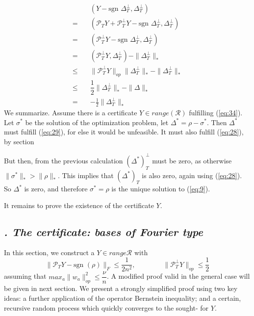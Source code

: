\documentclass{article}
\begin{document}
\begin{align*}
&(Y-\text{sgn }\Delta_T^\perp, \Delta_T^\perp)\\
=\quad&(\mathcal{P}_T Y + \mathcal{P}_T^\perp Y - \text{sgn }\Delta_T^\perp, \Delta_T^\perp)\\
=\quad&(\mathcal{P}_T^\perp Y - \text{sgn }\Delta_T^\perp, \Delta_T^\perp)\\
=\quad&(\mathcal{P}_T^\perp Y, \Delta_T^\perp)-\|\Delta_T^\perp\|_*\\
\le \quad&\|\mathcal{P}_T^\perp Y\|_{op}\|\Delta_T^\perp\|_*-\|\Delta_T^\perp\|_*\\
\le\quad& \dfrac{1}{2}\|\Delta_T^\perp\|_*-\|\Delta\|_*\\
=\quad&-\frac{1}{2}\|\Delta_T^\perp\|_*
\end{align*}
We summarize. Assume there is a certificate $Y \in range(\mathcal{R})$ fulfilling (\ref{eq:34}). Let $\sigma^*$ be the solution of the optimization problem, let $\Delta^* = \rho - \sigma^*$. Then $\Delta^*$ must fulfill (\ref{eq:29}), for else it would be unfeasible. It must also fulfill (\ref{eq:28}), by section \uppercase\expandafter{}

But then, from the previous calculation $(\Delta^*)_T^\perp$ must be zero, as otherwise $\|\sigma^*\|_* > \|\rho\|_*$. This implies that $(\Delta^*)_T$ is also zero, again using (\ref{eq:28}). So $\Delta^*$ is zero, and therefore $\sigma^* = \rho$ is the unique solution to (\ref{eq:9}).

It remains to prove the existence of the certificate $Y$.




\subsection{\textit{\uppercase\expandafter{}. The certificate: bases of Fourier type}}

In this section, we construct a $Y \in range \mathcal{R}$ with
\begin{equation}
\|\mathcal{P}_T Y- \text{sgn }(\rho)\|_F \le \dfrac{1}{2n^2}, \qquad \qquad \|\mathcal{P}_T^\perp Y\|_{op} \le \dfrac{1}{2}
\label{eq:35}
\end{equation}
assuming that $max_a\|w_a\|_{op}^2 \le \dfrac{\nu}{n}$. A modified proof valid in the general case will be given in next section. We present a strongly simplified proof using two key ideas: a further application of the operator Bernstein inequality; and a certain, recursive random process which quickly converges to the sought- for $Y$.
\end{document}
